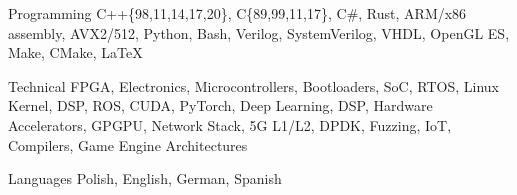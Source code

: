 

\begin{cvskills}

  \cvskill
    {Programming} %
    {C++\{98,11,14,17,20\}, C\{89,99,11,17\}, C\#, Rust, ARM/x86 assembly, AVX2/512, Python, Bash, Verilog, SystemVerilog, VHDL, OpenGL ES, Make, CMake, LaTeX} %

  \cvskill
    {Technical}
    {FPGA, Electronics, Microcontrollers, Bootloaders, SoC, RTOS, Linux Kernel, DSP, ROS, CUDA, PyTorch, Deep Learning, DSP, Hardware Accelerators, GPGPU, Network Stack, 5G L1/L2, DPDK, Fuzzing, IoT, Compilers, Game Engine Architectures}

  \cvskill
    {Languages} %
    {Polish, English, German, Spanish} %

\end{cvskills}
